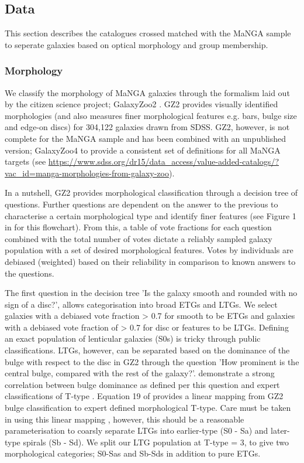 \subsection{Data} \label{sec:data_obs}
This section describes the catalogues crossed matched with the MaNGA sample to seperate galaxies based on optical morphology and group membership.

\subsubsection{Morphology} \label{sec:morph_def_obs}
We classify the morphology of MaNGA galaxies through the formalism laid out by the citizen science project; GalaxyZoo2 \citep[GZ2;][]{willett2013}. GZ2 provides visually identified morphologies (and also measures finer morphological features e.g. bars, bulge size and edge-on discs) for 304,122 galaxies drawn from SDSS. GZ2, however, is not complete for the MaNGA sample and has been combined with an unpublished version; GalaxyZoo4 to provide a consistent set of definitions for all MaNGA targets (see \url{https://www.sdss.org/dr15/data_access/value-added-catalogs/?vac_id=manga-morphologies-from-galaxy-zoo}). 

In a nutshell, GZ2 provides morphological classification through a decision tree of questions. Further questions are dependent on the answer to the previous to characterise a certain morphological type and identify finer features (see Figure 1 in \citet{willett2013} for this flowchart). From this, a table of vote fractions for each question combined with the total number of votes dictate a reliably sampled galaxy population with a set of desired morphological features. Votes by individuals are debiased (weighted) based on their reliability in comparison to known answers to the questions.

The first question in the decision tree 'Is the galaxy smooth and rounded with no sign of a disc?', allows categorisation into broad ETGs and LTGs. We select galaxies with a debiased vote fraction > 0.7 for smooth to be ETGs and galaxies with a debiased vote fraction of > 0.7 for disc or features to be LTGs. Defining an exact population of lenticular galaxies (S0s) is tricky through public classifications. LTGs, however, can be separated based on the dominance of the bulge with respect to the disc in GZ2 through the question 'How prominent is the central bulge, compared with the rest of the galaxy?'. \citet{willett2013} demonstrate a strong correlation between bulge dominance as defined per this question and expert classifications of T-type \citep{nair2010}. Equation 19 of \citet{willett2013} provides a linear mapping from GZ2 bulge classification to expert defined morphological T-type. Care must be taken in using this linear mapping \citep[see discussion in][]{willett2013}, however, this should be a reasonable parameterisation to coarsly separate LTGs into earlier-type (S0 - Sa) and later-type spirals (Sb - Sd). We split our LTG population at T-type = 3, to give two morphological categories; S0-Sas and Sb-Sds in addition to pure ETGs.

